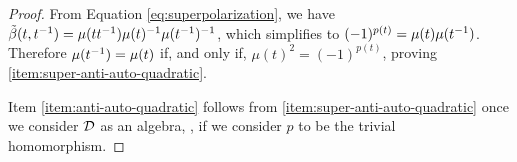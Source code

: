 \begin{proof}
    From Equation \eqref{eq:superpolarization}, we have $\tilde\beta (t, t^{-1}) = \mu (tt^{-1}) \mu(t)^{-1} \mu(t^{-1})^{-1}$, which simplifies to $(-1)^{p(t)} = \mu(t)\mu(t^{-1})$. 
    Therefore $\mu(t^{-1}) = \mu(t)$ if, and only if, $\mu(t)^2 = (-1)^{p(t)}$, proving \eqref{item:super-anti-auto-quadratic}.

    Item \eqref{item:anti-auto-quadratic} follows from \eqref{item:super-anti-auto-quadratic} once we consider $\mathcal{D}$ as an algebra, \ie, if we consider $p$ to be the trivial homomorphism.
\end{proof}






